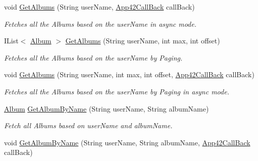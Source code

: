 \begin{DoxyCompactItemize}
void \hyperlink{classcom_1_1shephertz_1_1app42_1_1paas_1_1sdk_1_1csharp_1_1gallery_1_1_album_service_ab802e57174b699b05b9f8b5951f360d9}{Get\+Albums} (String user\+Name, \hyperlink{interfacecom_1_1shephertz_1_1app42_1_1paas_1_1sdk_1_1csharp_1_1_app42_call_back}{App42\+Call\+Back} call\+Back)
\begin{DoxyCompactList}\small\item\em Fetches all the Albums based on the user\+Name in async mode. \end{DoxyCompactList}\item 
I\+List$<$ \hyperlink{classcom_1_1shephertz_1_1app42_1_1paas_1_1sdk_1_1csharp_1_1gallery_1_1_album}{Album} $>$ \hyperlink{classcom_1_1shephertz_1_1app42_1_1paas_1_1sdk_1_1csharp_1_1gallery_1_1_album_service_ab23e6968259330284105bb0947ff892a}{Get\+Albums} (String user\+Name, int max, int offset)
\begin{DoxyCompactList}\small\item\em Fetches all the Albums based on the user\+Name by Paging. \end{DoxyCompactList}\item 
void \hyperlink{classcom_1_1shephertz_1_1app42_1_1paas_1_1sdk_1_1csharp_1_1gallery_1_1_album_service_aa53e9679f9af5a76348d007e422f5ac7}{Get\+Albums} (String user\+Name, int max, int offset, \hyperlink{interfacecom_1_1shephertz_1_1app42_1_1paas_1_1sdk_1_1csharp_1_1_app42_call_back}{App42\+Call\+Back} call\+Back)
\begin{DoxyCompactList}\small\item\em Fetches all the Albums based on the user\+Name by Paging in async mode. \end{DoxyCompactList}\item 
\hyperlink{classcom_1_1shephertz_1_1app42_1_1paas_1_1sdk_1_1csharp_1_1gallery_1_1_album}{Album} \hyperlink{classcom_1_1shephertz_1_1app42_1_1paas_1_1sdk_1_1csharp_1_1gallery_1_1_album_service_a1ae6b5dbcf2c0da6c2452c5507c57bab}{Get\+Album\+By\+Name} (String user\+Name, String album\+Name)
\begin{DoxyCompactList}\small\item\em Fetch all Albums based on user\+Name and album\+Name. \end{DoxyCompactList}\item 
void \hyperlink{classcom_1_1shephertz_1_1app42_1_1paas_1_1sdk_1_1csharp_1_1gallery_1_1_album_service_ab1fd14fd08b4498b9af058848dabeb14}{Get\+Album\+By\+Name} (String user\+Name, String album\+Name, \hyperlink{interfacecom_1_1shephertz_1_1app42_1_1paas_1_1sdk_1_1csharp_1_1_app42_call_back}{App42\+Call\+Back} call\+Back)

\end{DoxyCompactItemize}
